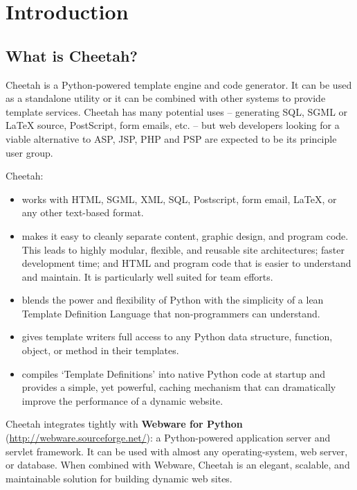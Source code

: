 \section{Introduction}
\label{intro}

\subsection{What is Cheetah?}
\label{intro.whatIs}

Cheetah is a Python-powered template engine and code generator.  It can be used
as a standalone utility or it can be combined with other systems to provide
template services.  Cheetah has many potential uses -- generating SQL, SGML or
LaTeX source, PostScript, form emails, etc. -- but web developers looking for a
viable alternative to ASP, JSP, PHP and PSP are expected to be its principle
user group.

Cheetah:
\begin{itemize}        
\item works with HTML, SGML, XML, SQL, Postscript, form email, LaTeX, or any
     other text-based format.
     
\item makes it easy to cleanly separate content, graphic design, and program
     code.  This leads to highly modular, flexible, and reusable site
     architectures; faster development time; and HTML and program code that is
     easier to understand and maintain. It is particularly well suited for team
     efforts.
     
\item blends the power and flexibility of Python with the simplicity of a lean
     Template Definition Language that non-programmers can understand.  
     
\item gives template writers full access to any Python data structure,
     function, object, or method in their templates.
     
\item compiles `Template Definitions' into native Python code at startup and
     provides a simple, yet powerful, caching mechanism that can dramatically
     improve the performance of a dynamic website.

\end{itemize}   

Cheetah integrates tightly with {\bf Webware for Python}
(\url{http://webware.sourceforge.net/}): a Python-powered application server and
servlet framework. It can be used with almost any operating-system, web server, or
database. When combined with Webware, Cheetah is an elegant, scalable, and
maintainable solution for building dynamic web sites.

